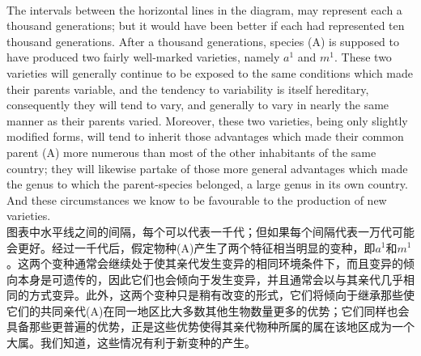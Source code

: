 \documentclass{article}
\begin{document}
\\
The intervals between the horizontal lines in the diagram, may represent each a thousand generations; but it would have been better if each had represented ten thousand generations. After a thousand generations, species (A) is supposed to have produced two fairly well-marked varieties, namely $a^1$ and $m^1$. These two varieties will generally continue to be exposed to the same conditions which made their parents variable, and the tendency to variability is itself hereditary, consequently they will tend to vary, and generally to vary in nearly the same manner as their parents varied. Moreover, these two varieties, being only slightly modified forms, will tend to inherit those advantages which made their common parent (A) more numerous than most of the other inhabitants of the same country; they will likewise partake of those more general advantages which made the genus to which the parent-species belonged, a large genus in its own country. And these circumstances we know to be favourable to the production of new varieties.\\
图表中水平线之间的间隔，每个可以代表一千代；但如果每个间隔代表一万代可能会更好。经过一千代后，假定物种(A)产生了两个特征相当明显的变种，即$a^1$和$m^1$。这两个变种通常会继续处于使其亲代发生变异的相同环境条件下，而且变异的倾向本身是可遗传的，因此它们也会倾向于发生变异，并且通常会以与其亲代几乎相同的方式变异。此外，这两个变种只是稍有改变的形式，它们将倾向于继承那些使它们的共同亲代(A)在同一地区比大多数其他生物数量更多的优势；它们同样也会具备那些更普遍的优势，正是这些优势使得其亲代物种所属的属在该地区成为一个大属。我们知道，这些情况有利于新变种的产生。 \\
\end{document}
